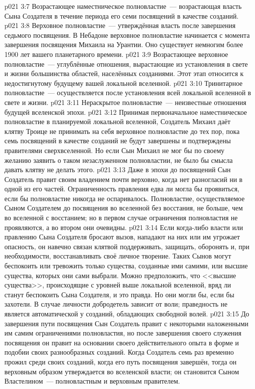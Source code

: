 \vs p021 3:7 Возрастающее наместническое полновластие~--- возрастающая власть Сына Создателя в течение периода его семи посвящений в качестве созданий.
\vs p021 3:8 Верховное полновластие~--- утверждённая власть после завершения седьмого посвящения. В Небадоне верховное полновластие начинается с момента завершения посвящения Михаила на Урантии. Оно существует немногим более 1900 лет вашего планетарного времени.
\vs p021 3:9 Возрастающее верховное полновластие~--- углублённые отношения, вырастающие из установления в свете и жизни большинства областей, населённых созданиями. Этот этап относится к недостигнутому будущему вашей локальной вселенной.
\vs p021 3:10 Тринитарное полновластие~--- осуществляется после установления всей локальной вселенной в свете и жизни.
\vs p021 3:11 Нераскрытое полновластие~--- неизвестные отношения будущей вселенской эпохи.
\vs p021 3:12 \pc Принимая первоначальное наместническое полновластие в планируемой локальной вселенной, Создатель Михаил даёт клятву Троице не принимать на себя верховное полновластие до тех пор, пока семь посвящений в качестве созданий не будут завершены и подтверждены правителями сверхвселенной. Но если Сын Михаил не мог бы по своему желанию заявить о таком незаслуженном полновластии, не было бы смысла давать клятву не делать этого.
\vs p021 3:13 Даже в эпохи до посвящений Сын Создатель правит своим владением почти верховно, когда нет разногласий ни в одной из его частей. Ограниченность правления едва ли могла бы проявиться, если бы полновластие никогда не оспаривалось. Полновластие, осуществляемое Сыном Создателем до посвящения во вселенной без восстания, не больше, чем во вселенной с восстанием; но в первом случае ограничения полновластия не проявляются, а во втором они очевидны.
\vs p021 3:14 Если когда\hyp{}либо власти или правлению Сына Создателя бросают вызов, нападают на них или им угрожает опасность, он навечно связан клятвой поддерживать, защищать, оборонять и, при необходимости, восстанавливать своё личное творение. Таких Сынов могут беспокоить или тревожить только существа, созданные ими самими, или высшие существа, которых они сами выбрали. Можно предположить, что <<высшие существа>>, происходящие с уровней выше локальной вселенной, вряд ли станут беспокоить Сына Создателя, и это правда. Но они могли бы, если бы захотели. В случае личности добродетель зависит от воли; праведность не является автоматической у созданий, обладающих свободной волей.
\vs p021 3:15 До завершения пути посвящения Сын Создатель правит с некоторыми наложенными им самим ограничениями полновластия, но после завершения своего служения посвящения он правит на основании своего действительного опыта в форме и подобии своих разнообразных созданий. Когда Создатель семь раз временно прожил среди своих созданий, когда его путь посвящения завершён, тогда он верховным образом утверждается во вселенской власти; он становится Сыном Властелином~--- полновластным и верховным правителем.
